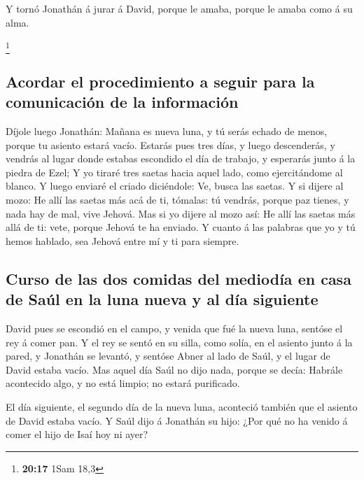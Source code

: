  Y tornó Jonathán á jurar á David, porque le amaba,
porque le amaba como á su alma.

\footnote{\textbf{20:17} 1Sam 18,3}

\hypertarget{acordar-el-procedimiento-a-seguir-para-la-comunicaciuxf3n-de-la-informaciuxf3n}{%
\subsection{Acordar el procedimiento a seguir para la comunicación de la
información}\label{acordar-el-procedimiento-a-seguir-para-la-comunicaciuxf3n-de-la-informaciuxf3n}}

 Díjole luego Jonathán: Mañana es nueva luna, y tú serás
echado de menos, porque tu asiento estará vacío.  Estarás
pues tres días, y luego descenderás, y vendrás al lugar donde estabas
escondido el día de trabajo, y esperarás junto á la piedra de Ezel;
 Y yo tiraré tres saetas hacia aquel lado, como
ejercitándome al blanco.  Y luego enviaré el criado
diciéndole: Ve, busca las saetas. Y si dijere al mozo: He allí las
saetas más acá de ti, tómalas: tú vendrás, porque paz tienes, y nada hay
de mal, vive Jehová.  Mas si yo dijere al mozo así: He
allí las saetas más allá de ti: vete, porque Jehová te ha enviado.
 Y cuanto á las palabras que yo y tú hemos hablado, sea
Jehová entre mí y ti para siempre.

\hypertarget{curso-de-las-dos-comidas-del-medioduxeda-en-casa-de-sauxfal-en-la-luna-nueva-y-al-duxeda-siguiente}{%
\subsection{Curso de las dos comidas del mediodía en casa de Saúl en la
luna nueva y al día
siguiente}\label{curso-de-las-dos-comidas-del-medioduxeda-en-casa-de-sauxfal-en-la-luna-nueva-y-al-duxeda-siguiente}}

 David pues se escondió en el campo, y venida que fué la
nueva luna, sentóse el rey á comer pan.  Y el rey se
sentó en su silla, como solía, en el asiento junto á la pared, y
Jonathán se levantó, y sentóse Abner al lado de Saúl, y el lugar de
David estaba vacío.  Mas aquel día Saúl no dijo nada,
porque se decía: Habrále acontecido algo, y no está limpio; no estará
purificado.

 El día siguiente, el segundo día de la nueva luna,
aconteció también que el asiento de David estaba vacío. Y Saúl dijo á
Jonathán su hijo: ¿Por qué no ha venido á comer el hijo de Isaí hoy ni
ayer?

